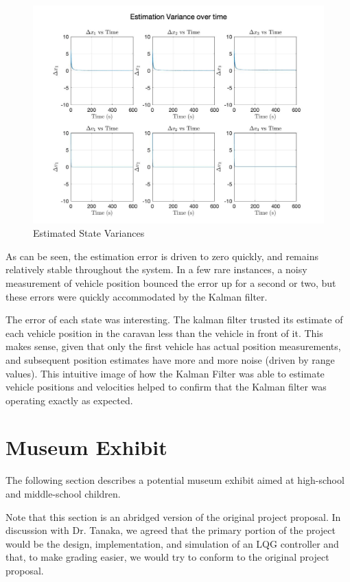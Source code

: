 \documentclass[12pt,onecolumn,reqno]{amsart}
\begin{document}
\begin{figure}[H]
	\includegraphics[width=\linewidth]{estimation_variance_over_time.jpg}
	\caption{Estimated State Variances}
	\label{fig:Est. State Vars}
\end{figure}

As can be seen, the estimation error is driven to zero quickly, and remains
relatively stable throughout the system. In a few rare instances, a noisy
measurement of vehicle position bounced the error up for a second or two, but
these errors were quickly accommodated by the Kalman filter.

The error of each state was interesting. The kalman filter trusted its estimate
of each vehicle position in the caravan less than the vehicle in front of it.
This makes sense, given that only the first vehicle has actual position
measurements, and subsequent position estimates have more and more noise (driven
by range values). This intuitive image of how the Kalman Filter was able to
estimate vehicle positions and velocities helped to confirm that the Kalman
filter was operating exactly as expected.


\section{Museum Exhibit}
The following section describes a potential museum exhibit aimed at high-school
and middle-school children.

Note that this section is an abridged version of the original project proposal.
In discussion with Dr. Tanaka, we agreed that the primary portion of the project
would be the design, implementation, and simulation of an LQG controller and
that, to make grading easier, we would try to conform to the original project
proposal.
\end{document}

